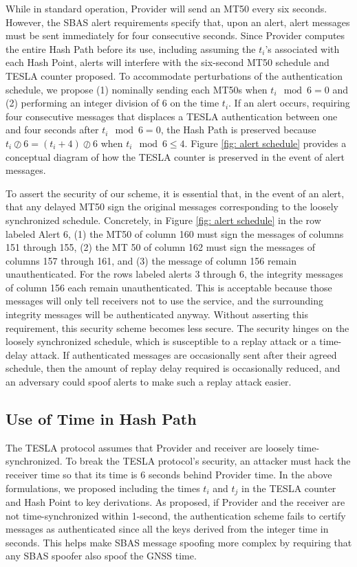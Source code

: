 \documentclass[letterpaper,times]{IONconf/IONconf}
\begin{document}
While in standard operation, Provider will send an MT50 every six seconds.
However, the SBAS alert requirements specify that, upon an alert, alert messages must be sent immediately for four consecutive seconds.
Since Provider computes the entire Hash Path before its use, including assuming the $t_i$'s associated with each Hash Point, alerts will interfere with the six-second MT50 schedule and TESLA counter proposed.
To accommodate perturbations of the authentication schedule, we propose (1) nominally sending each MT50s when $t_i \mod 6 = 0$ and (2) performing an integer division of 6 on the time $t_i$.
If an alert occurs, requiring four consecutive messages that displaces a TESLA authentication between one and four seconds after $t_i \mod 6 = 0$, the Hash Path is preserved because $t_i \oslash 6 = (t_i + 4) \oslash 6$ when $t_i \mod 6 \leq 4 $.
Figure \ref{fig: alert schedule} provides a conceptual diagram of how the TESLA counter is preserved in the event of alert messages.

To assert the security of our scheme, it is essential that, in the event of an alert, that any delayed MT50 sign the original messages corresponding to the loosely synchronized schedule.
Concretely, in Figure \ref{fig: alert schedule} in the row labeled Alert 6, (1) the MT50 of column 160 must sign the messages of columns 151 through 155, (2) the MT 50 of column 162 must sign the messages of columns 157 through 161, and (3) the message of column 156 remain unauthenticated.
For the rows labeled alerts 3 through 6, the integrity messages of column 156 each remain unauthenticated.
This is acceptable because those messages will only tell receivers not to use the service, and the surrounding integrity messages will be authenticated anyway.
Without asserting this requirement, this security scheme becomes less secure.
The security hinges on the loosely synchronized schedule, which is susceptible to a replay attack or a time-delay attack.
If authenticated messages are occasionally sent after their agreed schedule, then the amount of replay delay required is occasionally reduced, and an adversary could spoof alerts to make such a replay attack easier.

\subsection{Use of Time in Hash Path} \label{sec: time and keys}

The TESLA protocol assumes that Provider and receiver are loosely time-synchronized.
To break the TESLA protocol's security, an attacker must hack the receiver time so that its time is 6 seconds behind Provider time.
In the above formulations, we proposed including the times $t_i$ and $t_j$ in the TESLA counter and Hash Point to key derivations.
As proposed, if Provider and the receiver are not time-synchronized within 1-second, the authentication scheme fails to certify messages as authenticated since all the keys derived from the integer time in seconds.
This helps make SBAS message spoofing more complex by requiring that any SBAS spoofer also spoof the GNSS time.
\end{document}
